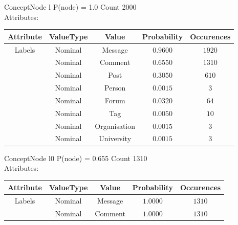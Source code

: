 
 
ConceptNode l \hspace{1cm} P(node) = 1.0 \hspace{1cm} Count 2000
\\ Attributes: \\ 
 \begin{table}[h] 
  \centering 
 \begin{longtable}{|c|c|c|c|c|} \hline 
Attribute & ValueType & Value & Probability & Occurences \\ \hline 
\multirow{8}{*}{Labels} & Nominal & Message & $0.9600$ & $1920$ \\ \cline{2-5} 
 & Nominal & Comment & $0.6550$ & $1310$ \\ \cline{2-5} 
 & Nominal & Post & $0.3050$ & $610$ \\ \cline{2-5} 
 & Nominal & Person & $0.0015$ & $3$ \\ \cline{2-5} 
 & Nominal & Forum & $0.0320$ & $64$ \\ \cline{2-5} 
 & Nominal & Tag & $0.0050$ & $10$ \\ \cline{2-5} 
 & Nominal & Organisation & $0.0015$ & $3$ \\ \cline{2-5} 
 & Nominal & University & $0.0015$ & $3$ \\ \hline 
\end{longtable}
 \end{table} 


 
ConceptNode l0 \hspace{1cm} P(node) = 0.655 \hspace{1cm} Count 1310
\\ Attributes: \\ 
 \begin{table}[h] 
  \centering 
 \begin{longtable}{|c|c|c|c|c|} \hline 
Attribute & ValueType & Value & Probability & Occurences \\ \hline 
\multirow{2}{*}{Labels} & Nominal & Message & $1.0000$ & $1310$ \\ \cline{2-5} 
 & Nominal & Comment & $1.0000$ & $1310$ \\ \hline 
\end{longtable}
 \end{table} 


